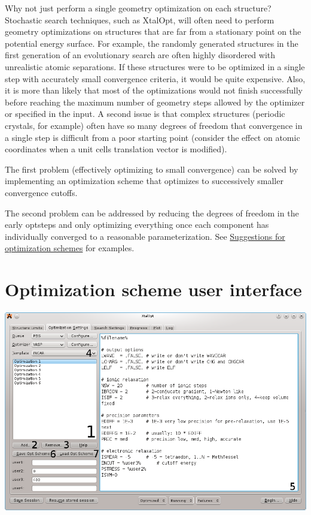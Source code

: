Why not just perform a single geometry optimization on each structure? Stochastic search techniques, such as Xtal\+Opt, will often need to perform geometry optimizations on structures that are far from a stationary point on the potential energy surface. For example, the randomly generated structures in the first generation of an evolutionary search are often highly disordered with unrealistic atomic separations. If these structures were to be optimized in a single step with accurately small convergence criteria, it would be quite expensive. Also, it is more than likely that most of the optimizations would not finish successfully before reaching the maximum number of geometry steps allowed by the optimizer or specified in the input. A second issue is that complex structures (periodic crystals, for example) often have so many degrees of freedom that convergence in a single step is difficult from a poor starting point (consider the effect on atomic coordinates when a unit cell\textquotesingle{}s translation vector is modified).

The first problem (effectively optimizing to small convergence) can be solved by implementing an optimization scheme that optimizes to successively smaller convergence cutoffs.

The second problem can be addressed by reducing the degrees of freedom in the early optsteps and only optimizing everything once each component has individually converged to a reasonable parameterization. See \hyperlink{optschemes_suggest}{Suggestions for optimization schemes} for examples.\hypertarget{optschemes_gui}{}\section{Optimization scheme user interface}\label{optschemes_gui}
 
\begin{DoxyImageNoCaption}
  \mbox{\includegraphics[width=\textwidth]{optschemes-numberededitor.png}}
\end{DoxyImageNoCaption}


